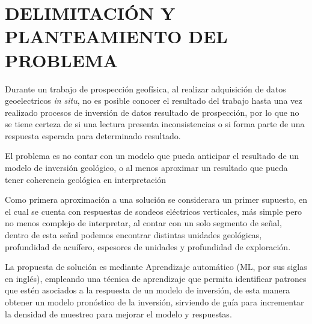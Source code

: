 \chapter{DELIMITACIÓN Y PLANTEAMIENTO DEL PROBLEMA}
Durante un trabajo de prospección geofísica, al realizar adquisición de datos geoelectricos \textit{in situ}, no es posible conocer el resultado del trabajo hasta una vez realizado procesos de inversión de datos resultado de prospección, por lo que no se tiene certeza de si una lectura presenta inconsistencias o si forma parte de una respuesta esperada para determinado resultado.

El problema es no contar con un modelo que pueda anticipar el resultado de un modelo de inversión geológico, o al menos aproximar un resultado que pueda tener coherencia geológica en interpretación

Como primera aproximación a una solución se considerara un primer supuesto, en el cual se cuenta con respuestas de sondeos eléctricos verticales, más simple pero no menos complejo de interpretar, al contar con un solo segmento de señal, dentro de esta señal podemos encontrar distintas unidades geológicas, profundidad de acuífero, espesores de unidades y profundidad de exploración.

La propuesta de solución es mediante Aprendizaje automático (ML, por sus siglas en inglés), empleando una técnica de aprendizaje que permita identificar patrones que estén asociados a la respuesta de un modelo de inversión, de esta manera obtener un modelo pronóstico de la inversión, sirviendo de guía para incrementar la densidad de muestreo para mejorar el modelo y respuestas.  
